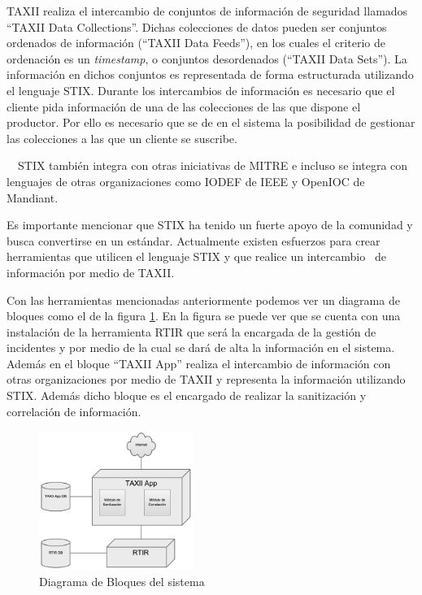 \bigskip

	TAXII realiza el intercambio de conjuntos de información de seguridad llamados ``TAXII Data Collections''. Dichas
	colecciones de datos pueden ser conjuntos ordenados de información (``TAXII Data Feeds''), en los cuales el criterio de
	ordenación es un \textit{timestamp}, o conjuntos desordenados (``TAXII Data Sets''). La información en dichos conjuntos
	es representada de forma estructurada utilizando el lenguaje STIX. Durante los intercambios de información es necesario
	que el cliente pida información de una de las colecciones de las que dispone el productor. Por ello es necesario que se
	de en el sistema la posibilidad de gestionar las colecciones a las que un cliente se suscribe.


\bigskip

	\ \ STIX también integra con otras iniciativas de MITRE e incluso se integra con lenguajes de otras organizaciones como
	IODEF de IEEE y OpenIOC de Mandiant.


\bigskip

	Es importante mencionar que STIX ha tenido un fuerte apoyo de la comunidad y busca convertirse en un estándar. Actualmente
	existen esfuerzos para crear herramientas que utilicen el lenguaje STIX y que realice un intercambio \ de información
	por medio de TAXII.

\bigskip

	Con las herramientas mencionadas anteriormente podemos ver un diagrama de bloques como el de la figura \ref{fig.diagramabloques}. En la figura
	se puede ver que se cuenta con una instalación de la herramienta RTIR que será la encargada de la gestión de incidentes
	y por medio de la cual se dará de alta la información en el sistema. Además en el bloque ``TAXII App'' realiza el
	intercambio de información con otras organizaciones por medio de TAXII y representa la información utilizando STIX.
	Además dicho bloque es el encargado de realizar la sanitización y correlación de información.

\begin{figure}[h!]
	\centering
	\includegraphics[width=1.9673in,height=1.7811in]{Analisis22-img/Analisis22-img016.png}
	\caption{Diagrama de Bloques del sistema}
	\label{fig.diagramabloques}
\end{figure}


